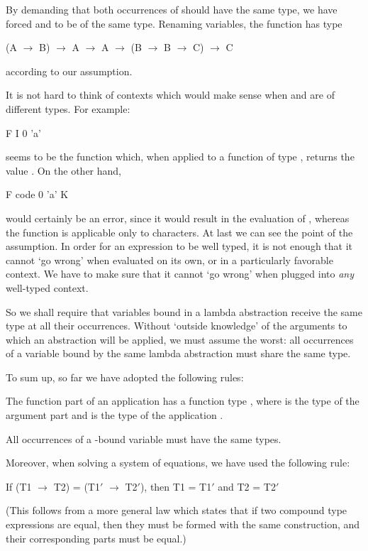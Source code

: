 By demanding that both occurrences of  should have the same type, we
have forced  and  to be of the same type. Renaming variables, the function 
has type
\begin{mlcoded}
    (A $\rightarrow$ B) $\rightarrow$ A $\rightarrow$ A $\rightarrow$ (B $\rightarrow$ B $\rightarrow$ C) $\rightarrow$ C
\end{mlcoded}
according to our assumption.

It is not hard to think of contexts  which would make sense when 
and  are of different types. For example:
\begin{mlcoded}
    F I 0 'a'
\end{mlcoded}
seems to be the function which, when applied to a function  of type
, returns the value . On the other hand,
\begin{mlcoded}
    F code 0 'a' K
\end{mlcoded}
would certainly be an error, since it would result in the evaluation of ,
whereas the function  is applicable only to characters. At last we can see
the point of the assumption. In order for an expression to be well typed, it is
not enough that it cannot `go wrong' when evaluated on its own, or in a
particularly favorable context. We have to make sure that it cannot `go wrong'
when plugged into \textit{any} well-typed context.

So we shall require that variables bound in a lambda abstraction receive the
same type at all their occurrences. Without `outside knowledge' of the
arguments to which an abstraction will be applied, we must assume the worst:
all occurrences of a variable bound by the same lambda abstraction must
share the same type.

To sum up, so far we have adopted the following rules:
\begin{numbered}
    \item The function part  of an application  has a function type ,
    where  is the type of the argument part  and  is the type of the
    application .
    \item All occurrences of a \ml{\tl}-bound variable must have the same types.
\end{numbered}

Moreover, when solving a system of equations, we have used the following
rule:
\begin{mlcoded}
    \textnormal{If} (T1 $\rightarrow$ T2) = (T1$'$ $\rightarrow$ T2$'$), \textnormal{then} T1 = T1$'$ \textnormal{and} T2 = T2$'$
\end{mlcoded}
(This follows from a more general law which states that if two compound type
expressions are equal, then they must be formed with the same construction,
and their corresponding parts must be equal.)

